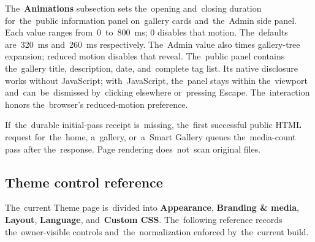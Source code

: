 \documentclass[11pt,a4paper]{article}
\newcommand{\ui}[1]{\textbf{#1}}
\begin{document}
The~\ui{Animations} subsection sets the~opening and~closing duration
for~the~public information panel on~gallery cards and~the~Admin side panel. Each
value ranges from~0~to~800~ms; 0 disables that motion. The~defaults are~320~ms
and~260~ms respectively. The~Admin value also times gallery-tree expansion;
reduced motion disables that reveal. The~public panel contains the~gallery title,
description, date, and~complete tag list. Its native disclosure works without
JavaScript; with~JavaScript, the~panel stays within the~viewport
and~can~be~dismissed by~clicking elsewhere or~pressing Escape. The~interaction
honors the~browser's reduced-motion preference.

If~the~durable initial-pass receipt is~missing, the~first successful public
HTML request for~the~home, a~gallery, or~a~Smart Gallery queues the~media-count
pass after the~response. Page rendering does~not~scan original files.

\subsection{Theme control reference}

The~current Theme page is~divided into \ui{Appearance}, \ui{Branding \& media},
\ui{Layout}, \ui{Language}, and~\ui{Custom CSS}. The~following reference records
the~owner-visible controls and~the~normalization enforced by~the~current build.
\end{document}
